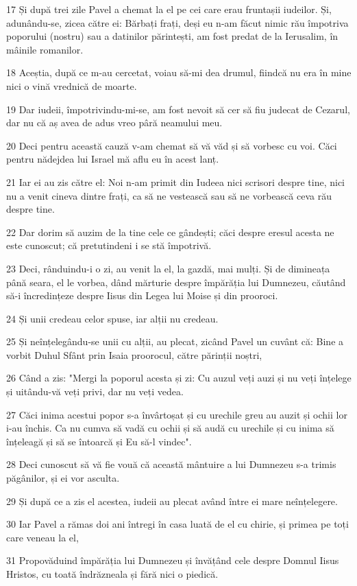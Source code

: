 \par 17 Și după trei zile Pavel a chemat la el pe cei care erau fruntașii iudeilor. Și, adunându-se, zicea către ei: Bărbați frați, deși eu n-am făcut nimic rău împotriva poporului (nostru) sau a datinilor părintești, am fost predat de la Ierusalim, în mâinile romanilor.
\par 18 Aceștia, după ce m-au cercetat, voiau să-mi dea drumul, fiindcă nu era în mine nici o vină vrednică de moarte.
\par 19 Dar iudeii, împotrivindu-mi-se, am fost nevoit să cer să fiu judecat de Cezarul, dar nu că aș avea de adus vreo pâră neamului meu.
\par 20 Deci pentru această cauză v-am chemat să vă văd și să vorbesc cu voi. Căci pentru nădejdea lui Israel mă aflu eu în acest lanț.
\par 21 Iar ei au zis către el: Noi n-am primit din Iudeea nici scrisori despre tine, nici nu a venit cineva dintre frați, ca să ne vestească sau să ne vorbească ceva rău despre tine.
\par 22 Dar dorim să auzim de la tine cele ce gândești; căci despre eresul acesta ne este cunoscut; că pretutindeni i se stă împotrivă.
\par 23 Deci, rânduindu-i o zi, au venit la el, la gazdă, mai mulți. Și de dimineața până seara, el le vorbea, dând mărturie despre împărăția lui Dumnezeu, căutând să-i încredințeze despre Iisus din Legea lui Moise și din prooroci.
\par 24 Și unii credeau celor spuse, iar alții nu credeau.
\par 25 Și neînțelegându-se unii cu alții, au plecat, zicând Pavel un cuvânt că: Bine a vorbit Duhul Sfânt prin Isaia proorocul, către părinții noștri,
\par 26 Când a zis: "Mergi la poporul acesta și zi: Cu auzul veți auzi și nu veți înțelege și uitându-vă veți privi, dar nu veți vedea.
\par 27 Căci inima acestui popor s-a învârtoșat și cu urechile greu au auzit și ochii lor i-au închis. Ca nu cumva să vadă cu ochii și să audă cu urechile și cu inima să înțeleagă și să se întoarcă și Eu să-l vindec".
\par 28 Deci cunoscut să vă fie vouă că această mântuire a lui Dumnezeu s-a trimis păgânilor, și ei vor asculta.
\par 29 Și după ce a zis el acestea, iudeii au plecat având între ei mare neînțelegere.
\par 30 Iar Pavel a rămas doi ani întregi în casa luată de el cu chirie, și primea pe toți care veneau la el,
\par 31 Propovăduind împărăția lui Dumnezeu și învățând cele despre Domnul Iisus Hristos, cu toată îndrăzneala și fără nici o piedică.



